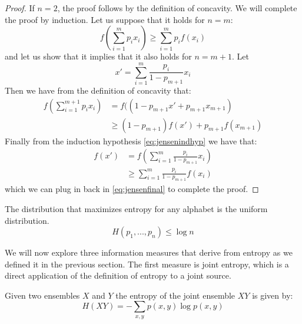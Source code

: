 \begin{proof}
If $n=2$, the proof follows by the definition of concavity. We will complete the proof by induction.
Let us suppose that it holds for $n=m$: 
\begin{equation}
\label{eq:jensenindhyp}
 f\left(\sum_{i=1}^mp_ix_i\right) \geq \sum_{i=1}^mp_if(x_i) 
\end{equation}
and let us show that it implies that it also holds for $n=m+1$. Let 
\begin{equation}
x'=\sum_{i=1}^m\frac{p_i}{1-p_{m+1}}x_i
\end{equation}
Then we have from the definition of concavity that:
\begin{align}
f\left(\sum_{i=1}^{m+1}p_ix_i\right) &= f((1-p_{m+1}x'+p_{m+1}x_{m+1})\\
                                     &\geq (1-p_{m+1})f(x')+p_{m+1}f(x_{m+1})\label{eq:jensenfinal}
\end{align}
Finally from the induction hypothesis \eqref{eq:jensenindhyp} we have that:
\begin{align}
f(x')&=f\left(\sum_{i=1}^m\frac{p_i}{1-p_{m+1}}x_i\right)\\
     &\geq \sum_{i=1}^m\frac{p_i}{1-p_{m+1}}f(x_i)
\end{align}
which we can plug in back in \eqref{eq:jensenfinal} to complete the proof.
\end{proof}
%

\begin{exercise}
\label{ex:uniform}
The distribution that maximizes entropy for any alphabet is the uniform distribution.
\begin{equation*}
H(p_1, ..., p_n)\leq \log n
\end{equation*}
\end{exercise}

We will now explore three information measures that derive from entropy as we defined it in the previous section. The first measure is joint entropy, which is a direct application of the definition of entropy to a joint source.
\begin{definition}
Given two ensembles ${X}$ and ${Y}$ the entropy of the joint ensemble $XY$ is given by:
\begin{equation}
H({XY}) = - \sum_{x,y} p(x,y)\log p(x,y)
\end{equation}
\end{definition}

